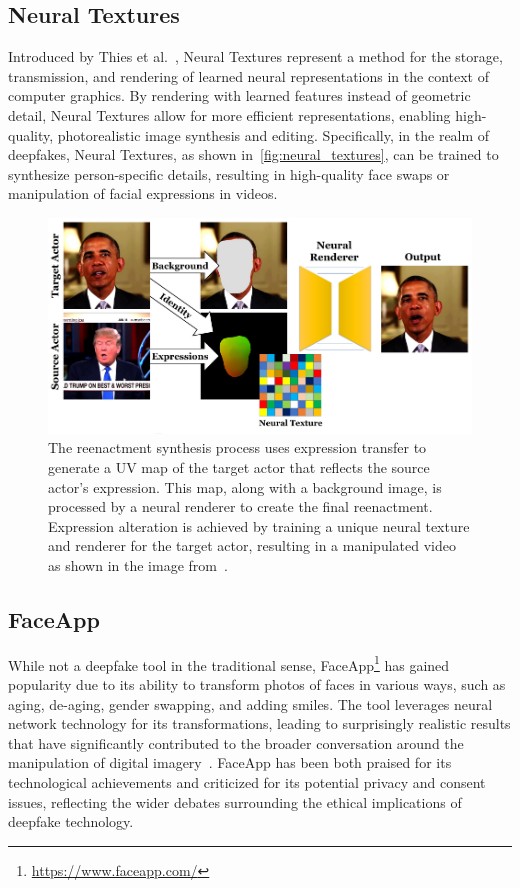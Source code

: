 \subsection{Neural Textures}
Introduced by Thies et al.~\cite{thies2019deferred}, Neural Textures represent
a method for the storage, transmission, and rendering of learned
neural representations in the context of computer graphics.
By rendering with learned features instead of geometric detail, Neural
Textures allow for more efficient representations, enabling high-quality,
photorealistic image synthesis and editing. Specifically, in the realm of
deepfakes, Neural Textures, as shown in~\autoref{fig:neural_textures}, can be trained to synthesize person-specific
details, resulting in high-quality face swaps or manipulation of facial
expressions in videos.

\begin{figure}[hb]
	\centering
	\includegraphics[width=0.7\columnwidth]{figures/neural_textures}
	\caption{The reenactment synthesis process uses expression transfer 
    to generate a UV map of the target actor that reflects the source 
    actor's expression. This map, along with a background image, is 
    processed by a neural renderer to create the final reenactment. 
    Expression alteration is achieved by training a unique neural 
    texture and renderer for the target actor, resulting in a 
    manipulated video as shown in the image from~\cite{thies2019deferred}.}\label{fig:neural_textures}
\end{figure}


\subsection{FaceApp}
While not a deepfake tool in the traditional sense,
FaceApp\footnote{\url{https://www.faceapp.com/}} has gained popularity due
to its ability to transform photos of faces in various ways, such as aging,
de-aging, gender swapping, and adding smiles. The tool leverages neural
network technology for its transformations, leading to surprisingly
realistic results that have significantly contributed to the broader conversation
around the manipulation of digital imagery~\cite{faceapp}. FaceApp has
been both praised for its technological achievements and criticized for
its potential privacy and consent issues, reflecting the wider debates
surrounding the ethical implications of deepfake technology.

